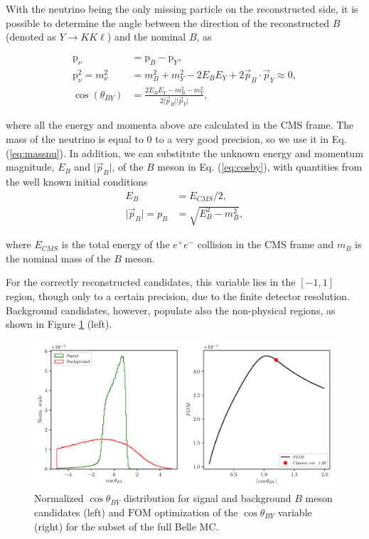With the neutrino being the only missing particle on the reconstructed side, it is possible to determine the angle between the direction of the reconstructed $B$ (denoted as $Y \to K K \ell$) and the nominal $B$, as

\begin{align}
\mathrm{p}_\nu &= \mathrm{p}_B - \mathrm{p}_{Y}, \\
\label{eq:massnu}
\mathrm{p}_\nu^2 = m_\nu^2 &= m_B^2 + m_Y^2 - 2E_BE_Y + 2\vec{p}_B \cdot \vec{p}_Y \approx 0, \\ 
\label{eq:cosby}
\cos \left(\theta_{BY}\right) &= \frac{2E_BE_Y - m_B^2 - m_Y^2}{2\vert \vec{p}_B \vert \vert \vec{p}_Y\vert},
\end{align} 

where all the energy and momenta above are calculated in the CMS frame. The mass of the neutrino is equal to 0 to a very good precision, so we use it in Eq. (\ref{eq:massnu}). In addition, we can substitute the unknown energy and momentum magnitude, $E_B$ and $\vert \vec{p}_B \vert$, of the $B$ meson in Eq. (\ref{eq:cosby}), with quantities from the well known initial conditions
\begin{align}
E_B &= E_{CMS} / 2,\\
\vert \vec{p}_B \vert = p_B &= \sqrt{E_B^2 - m_B^2},
\end{align} 

where $E_{CMS}$ is the total energy of the $e^+e^-$ collision in the CMS frame and $m_B$ is the nominal mass of the $B$ meson. 

For the correctly reconstructed candidates, this variable lies in the $[-1,1]$ region, though only to a certain precision, due to the finite detector resolution. Background candidates, however, populate also the non-physical regions, as shown in Figure \ref{fig:cosby} (left). 

\begin{figure}[!htb]
	\centering
	\captionsetup{width=.8\linewidth}
	\includegraphics[width=\linewidth]{fig/cosBY}
	\caption{Normalized $\cos \theta_{BY}$ distribution for signal and background $B$ meson candidates (left) and $\mathrm{FOM}$ optimization of the $\cos \theta_{BY}$ variable (right) for the subset of the full Belle MC.}
	\label{fig:cosby}
\end{figure}

